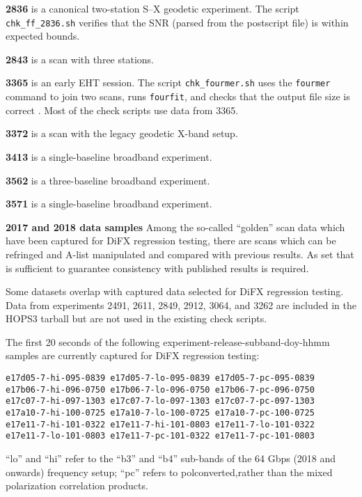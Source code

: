 \begin{description}
\item{\textbf{2836}} is a canonical two-station S--X geodetic experiment. The script \texttt{chk\_ff\_2836.sh} verifies that the SNR (parsed from the postscript file) is within expected bounds.
\item{\textbf{2843}} is a scan with three stations.
\item{\textbf{3365}} is an early \ac{EHT} session. The script \texttt{chk\_fourmer.sh} uses the \texttt{fourmer} command to join two scans, runs \texttt{fourfit}, and checks that the output file size is correct . Most of the check scripts use data from 3365.
\item{\textbf{3372}} is a scan with the legacy geodetic X-band setup.
\item{\textbf{3413}} is a single-baseline broadband experiment.
\item{\textbf{3562}} is a three-baseline broadband experiment.
\item{\textbf{3571}} is a single-baseline broadband experiment.
\item{\textbf{2017 and 2018 data samples}} Among the so-called ``golden'' scan data which have been captured for \acs{DiFX} regression testing, there are scans which can be refringed and \acs{A-list} manipulated and compared with previous results.  As set that is sufficient to guarantee consistency with published results is required. 
\end{description}
Some datasets overlap with captured data selected for DiFX regression testing.   Data from experiments 2491, 2611, 2849, 2912, 3064, and 3262 are included in the HOPS3 tarball but are not used in the existing check scripts.

The first 20 seconds of the following experiment-release-subband-doy-hhmm samples are currently captured for \acs{DiFX} regression testing:
\begin{verbatim}
e17d05-7-hi-095-0839 e17d05-7-lo-095-0839 e17d05-7-pc-095-0839
e17b06-7-hi-096-0750 e17b06-7-lo-096-0750 e17b06-7-pc-096-0750
e17c07-7-hi-097-1303 e17c07-7-lo-097-1303 e17c07-7-pc-097-1303
e17a10-7-hi-100-0725 e17a10-7-lo-100-0725 e17a10-7-pc-100-0725
e17e11-7-hi-101-0322 e17e11-7-hi-101-0803 e17e11-7-lo-101-0322
e17e11-7-lo-101-0803 e17e11-7-pc-101-0322 e17e11-7-pc-101-0803
\end{verbatim}
``lo'' and ``hi'' refer to the ``b3'' and ``b4'' sub-bands of the
64 \acs{Gbps} (2018 and onwards) frequency setup; ``pc'' refers to polconverted,rather than the mixed polarization correlation products.

